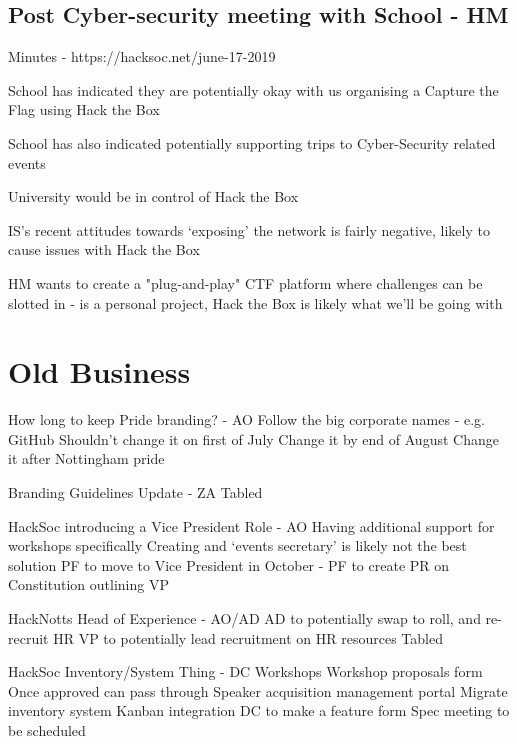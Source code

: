 \documentclass[11pt]{meetingmins}
\begin{document}
\subsection{Post Cyber-security meeting with School - HM}
\begin{hiddensubitems}
	\item Minutes - https://hacksoc.net/june-17-2019
	\item School has indicated they are potentially okay with us organising a Capture the Flag using Hack the Box
	\item School has also indicated potentially supporting trips to Cyber-Security related events
	\item University would be in control of Hack the Box
	\item IS's recent attitudes towards `exposing' the network is fairly negative, likely to cause issues with Hack the Box
	\item HM wants to create a "plug-and-play" CTF platform where challenges can be slotted in - is a personal project, Hack the Box is likely what we'll be going with
\end{hiddensubitems}


\section{Old Business}
\begin{items}
	\item How long to keep Pride branding? - AO
		\subitem Follow the big corporate names - e.g. GitHub
		\subitem Shouldn't change it on first of July
		\subitem Change it by end of August
		\subitem Change it after Nottingham pride
	\item Branding Guidelines Update - ZA
		\subitem Tabled
	\item HackSoc introducing a Vice President Role - AO
		\subitem Having additional support for workshops specifically
		\subitem Creating and `events secretary' is likely not the best solution
		\subitem PF to move to Vice President in October - PF to create PR on Constitution outlining VP
	\item HackNotts Head of Experience - AO/AD
		\subitem AD to potentially swap to roll, and re-recruit HR
		\subitem VP to potentially lead recruitment on HR resources
		\subitem Tabled
	\item HackSoc Inventory/System Thing - DC
		\subitem Workshops
			\subsubitem Workshop proposals form
			\subsubitem Once approved can pass through 
		\subitem Speaker acquisition management portal
		\subitem Migrate inventory system
		\subitem Kanban integration
		\subitem DC to make a feature form
		\subitem Spec meeting to be scheduled
\end{items}
\end{document}
